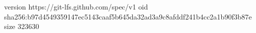 version https://git-lfs.github.com/spec/v1
oid sha256:b97d4549359147ec5143caaf5b645da32ad3a9c8afddf241b4cc2a1b90f3b87e
size 323630

